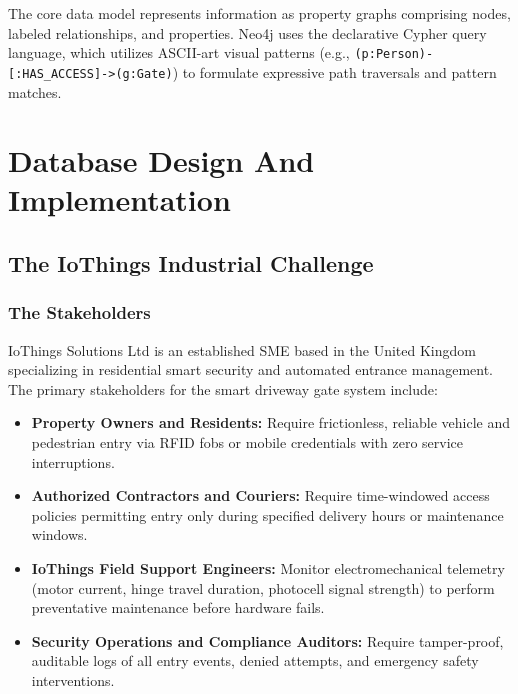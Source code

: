 \documentclass[11pt,a4paper]{article}
\begin{document}
The core data model represents information as property graphs comprising nodes, labeled relationships, and properties. Neo4j uses the declarative Cypher query language, which utilizes ASCII-art visual patterns (e.g., \texttt{(p:Person)-[:HAS\_ACCESS]->(g:Gate)}) to formulate expressive path traversals and pattern matches.

\section{Database Design And Implementation}

\subsection{The IoThings Industrial Challenge}

\subsubsection{The Stakeholders}
IoThings Solutions Ltd is an established SME based in the United Kingdom specializing in residential smart security and automated entrance management. The primary stakeholders for the smart driveway gate system include:
\begin{itemize}[noitemsep]
    \item \textbf{Property Owners and Residents:} Require frictionless, reliable vehicle and pedestrian entry via RFID fobs or mobile credentials with zero service interruptions.
    \item \textbf{Authorized Contractors and Couriers:} Require time-windowed access policies permitting entry only during specified delivery hours or maintenance windows.
    \item \textbf{IoThings Field Support Engineers:} Monitor electromechanical telemetry (motor current, hinge travel duration, photocell signal strength) to perform preventative maintenance before hardware fails.
    \item \textbf{Security Operations and Compliance Auditors:} Require tamper-proof, auditable logs of all entry events, denied attempts, and emergency safety interventions.
\end{itemize}
\end{document}
